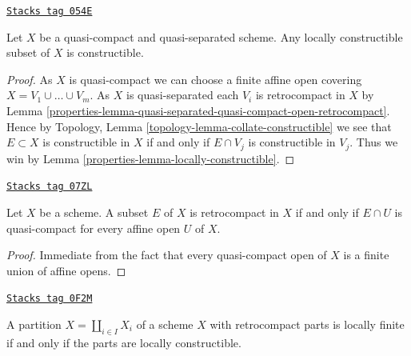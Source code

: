 \begin{lemma}
\label{properties-lemma-constructible-quasi-compact-quasi-separated}
\href{https://stacks.math.columbia.edu/tag/054E}{\texttt{Stacks tag 054E}}

Let $X$ be a quasi-compact and quasi-separated scheme.
Any locally constructible subset of $X$ is constructible.
\end{lemma}

\begin{proof}

As $X$ is quasi-compact we can choose a finite affine open covering
$X = V_1 \cup \ldots \cup V_m$. As $X$ is quasi-separated each $V_i$ is
retrocompact in $X$ by
Lemma \ref{properties-lemma-quasi-separated-quasi-compact-open-retrocompact}.
Hence by
Topology, Lemma \ref{topology-lemma-collate-constructible}
we see that $E \subset X$ is constructible in $X$ if and only if
$E \cap V_j$ is constructible in $V_j$. Thus we win by
Lemma \ref{properties-lemma-locally-constructible}.
\end{proof}

\begin{lemma}[Retrocompact]
\label{properties-lemma-retrocompact}
\href{https://stacks.math.columbia.edu/tag/07ZL}{\texttt{Stacks tag 07ZL}}

Let $X$ be a scheme. A subset $E$ of $X$ is retrocompact in $X$ if and only if
$E \cap U$ is quasi-compact for every affine open $U$ of $X$.
\end{lemma}

\begin{proof}
Immediate from the fact that every quasi-compact open of $X$ is a finite
union of affine opens.
\end{proof}

\begin{lemma}
\label{properties-lemma-stratification-locally-finite-constructible}
\href{https://stacks.math.columbia.edu/tag/0F2M}{\texttt{Stacks tag 0F2M}}

A partition $X = \coprod_{i \in I} X_i$ of a scheme $X$ with
retrocompact parts is locally finite if and only if the parts
are locally constructible.
\end{lemma}

